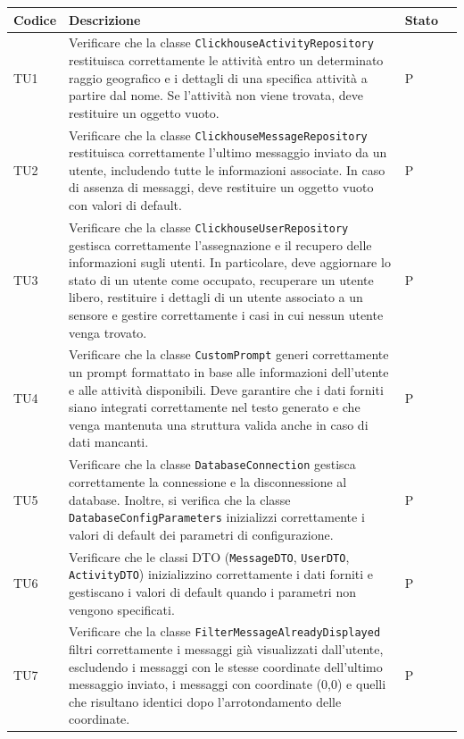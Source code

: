 \documentclass[10pt]{article}
\begin{document}
\begin{justify}
\begin{longtable}{|>{\centering\arraybackslash}m{2cm}|>{\centering\arraybackslash}m{7cm}|>{\centering\arraybackslash}m{2cm}|>{\centering\arraybackslash}m{2cm}|}
\hline
\textbf{Codice} & \textbf{Descrizione} & \textbf{Stato}\\
\endhead
\hline
TU1 & Verificare che la classe \texttt{ClickhouseActivityRepository} restituisca correttamente le attività entro un determinato raggio geografico e i dettagli di una specifica attività a partire dal nome. Se l'attività non viene trovata, deve restituire un oggetto vuoto. & P \\
\hline
TU2 & Verificare che la classe \texttt{ClickhouseMessageRepository} restituisca correttamente l'ultimo messaggio inviato da un utente, includendo tutte le informazioni associate. In caso di assenza di messaggi, deve restituire un oggetto vuoto con valori di default. & P \\
\hline
TU3 & Verificare che la classe \texttt{ClickhouseUserRepository} gestisca correttamente l'assegnazione e il recupero delle informazioni sugli utenti. In particolare, deve aggiornare lo stato di un utente come occupato, recuperare un utente libero, restituire i dettagli di un utente associato a un sensore e gestire correttamente i casi in cui nessun utente venga trovato. & P \\
\hline
TU4 & Verificare che la classe \texttt{CustomPrompt} generi correttamente un prompt formattato in base alle informazioni dell'utente e alle attività disponibili. Deve garantire che i dati forniti siano integrati correttamente nel testo generato e che venga mantenuta una struttura valida anche in caso di dati mancanti. & P \\
\hline
TU5 & Verificare che la classe \texttt{DatabaseConnection} gestisca correttamente la connessione e la disconnessione al database. Inoltre, si verifica che la classe \texttt{DatabaseConfigParameters} inizializzi correttamente i valori di default dei parametri di configurazione. & P \\
\hline
TU6 & Verificare che le classi DTO (\texttt{MessageDTO}, \texttt{UserDTO}, \texttt{ActivityDTO}) inizializzino correttamente i dati forniti e gestiscano i valori di default quando i parametri non vengono specificati. & P \\
\hline
TU7 & Verificare che la classe \texttt{FilterMessageAlreadyDisplayed} filtri correttamente i messaggi già visualizzati dall'utente, escludendo i messaggi con le stesse coordinate dell'ultimo messaggio inviato, i messaggi con coordinate (0,0) e quelli che risultano identici dopo l'arrotondamento delle coordinate. & P \\

\end{longtable}
\end{justify}
\end{document}

